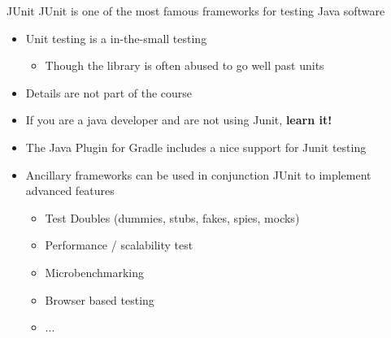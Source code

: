\documentclass[presentation]{beamer}
\begin{document}
\begin{frame}[fragile]{JUnit}
    JUnit is one of the most famous frameworks for testing Java software
    \begin{itemize}
        \item Unit testing is a in-the-small testing
        \begin{itemize}
            \item Though the library is often abused to go well past units
        \end{itemize}
        \item Details are not part of the course
        \item If you are a java developer and are not using Junit, \textbf{learn it!}
        \item The Java Plugin for Gradle includes a nice support for Junit testing
        \item Ancillary frameworks can be used in conjunction JUnit to implement advanced features
        \begin{itemize}
            \item Test Doubles (dummies, stubs, fakes, spies, mocks)
            \item Performance / scalability test
            \item Microbenchmarking
            \item Browser based testing
            \item ...
        \end{itemize}
    \end{itemize}
\end{frame}
\end{document}
